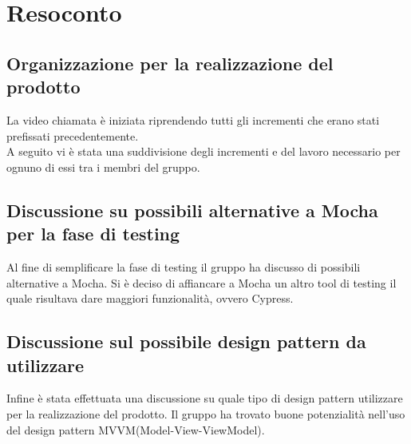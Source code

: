 \section{Resoconto}
\subsection{Organizzazione per la realizzazione del prodotto}
La video chiamata è iniziata riprendendo tutti gli incrementi che erano stati prefissati precedentemente.\\
A seguito vi è stata una suddivisione degli incrementi e del lavoro necessario per ognuno di essi tra i membri del gruppo.
\subsection{Discussione su possibili alternative a Mocha per la fase di testing}
Al fine di semplificare la fase di testing il gruppo ha discusso di possibili alternative a Mocha. Si è deciso di affiancare a Mocha un altro tool di testing il quale risultava dare maggiori funzionalità, ovvero Cypress.
\subsection{Discussione sul possibile design pattern da utilizzare}
Infine è stata effettuata una discussione su quale tipo di design pattern utilizzare per la realizzazione del prodotto. Il gruppo ha trovato buone potenzialità nell'uso del design pattern MVVM(Model-View-ViewModel).